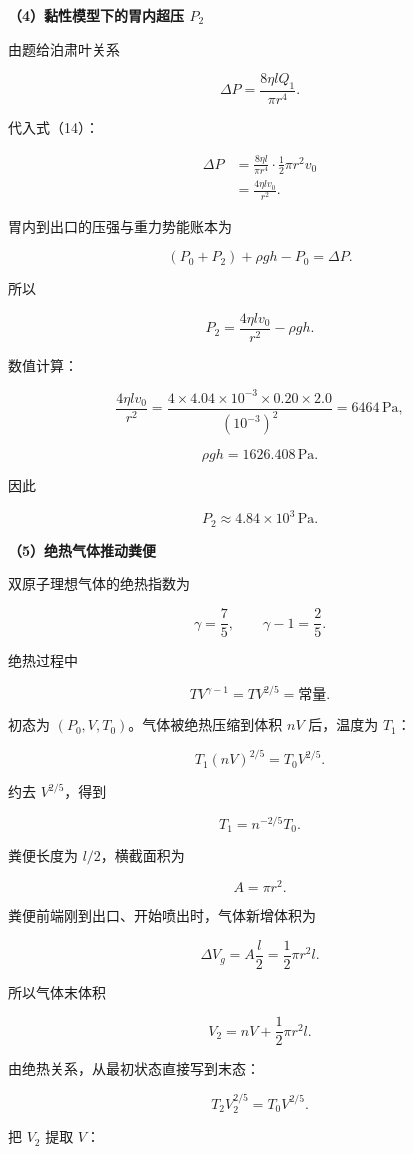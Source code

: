\documentclass[12pt,a4paper,UTF8]{ctexart}
\begin{document}
\textbf{（4）黏性模型下的胃内超压 \(P_2\)}

由题给泊肃叶关系

\[
\Delta P=\frac{8\eta lQ_1}{\pi r^4}.
\]

代入式（14）：

\[
\begin{aligned}
\Delta P
&=\frac{8\eta l}{\pi r^4}\cdot\frac12\pi r^2v_0\\
&=\frac{4\eta lv_0}{r^2}.
\end{aligned}
\tag{16}
\]

胃内到出口的压强与重力势能账本为

\[
(P_0+P_2)+\rho gh-P_0=\Delta P.
\tag{17}
\]

所以

\[
\boxed{P_2=\frac{4\eta lv_0}{r^2}-\rho gh}.
\tag{18}
\]

数值计算：

\[
\frac{4\eta lv_0}{r^2}
=\frac{4\times4.04\times10^{-3}\times0.20\times2.0}{(10^{-3})^2}
=6464\,\mathrm{Pa},
\]

\[
\rho gh=1626.408\,\mathrm{Pa}.
\]

因此

\[
\boxed{P_2\approx4.84\times10^3\,\mathrm{Pa}}.
\tag{19}
\]

\textbf{（5）绝热气体推动粪便}

双原子理想气体的绝热指数为

\[
\gamma=\frac75,
\qquad
\gamma-1=\frac25.
\]

绝热过程中

\[
TV^{\gamma-1}=TV^{2/5}=\text{常量}.
\tag{20}
\]

初态为 \((P_0,V,T_0)\)。气体被绝热压缩到体积 \(nV\) 后，温度为 \(T_1\)：

\[
T_1(nV)^{2/5}=T_0V^{2/5}.
\]

约去 \(V^{2/5}\)，得到

\[
\boxed{T_1=n^{-2/5}T_0}.
\tag{21}
\]

粪便长度为 \(l/2\)，横截面积为

\[
A=\pi r^2.
\]

粪便前端刚到出口、开始喷出时，气体新增体积为

\[
\Delta V_g=A\frac l2=\frac12\pi r^2l.
\]

所以气体末体积

\[
V_2=nV+\frac12\pi r^2l.
\]

由绝热关系，从最初状态直接写到末态：

\[
T_2V_2^{2/5}=T_0V^{2/5}.
\]

把 \(V_2\) 提取 \(V\)：
\end{document}
